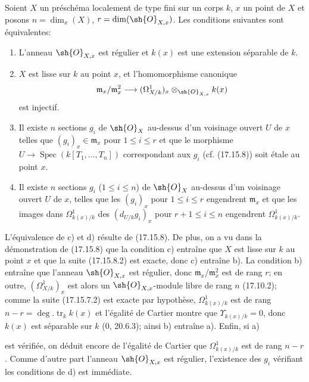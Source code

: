 \begin{corollary}[17.15.9]
\label{IV.17.15.9}
Soient $X$ un préschéma localement de type fini sur un corps $k$, $x$ un point de $X$ et posons $n=\dim_x(X)$, $r=\dim(\sh{O}_{X,x})$. Les conditions suivantes sont équivalentes:
\begin{enumerate}
  \item[a)] L'anneau $\sh{O}_{X,x}$ est régulier et $k(x)$ est une extension séparable de $k$.
  \item[b)] $X$ est lisse sur $k$ au point $x$, et l'homomorphisme canonique
  \[
  \mathfrak m_x/\mathfrak m_x^2\to(\Omega^1_{X/k})_x\otimes_{\sh{O}_{X,x}}k(x)
  \]
  est injectif.
  \item[c)] Il existe $n$ sections $g_i$ de $\sh{O}_X$ au-dessus d'un voisinage ouvert $U$ de $x$ telles que $(g_i)_x\in\mathfrak m_x$ pour $1\leq i\leq r$ et que le morphisme $U\to\operatorname{Spec}(k[T_1,\ldots,T_n])$ correspondant aux $g_i$ (cf. (17.15.8)) soit étale au point $x$.
  \item[d)] Il existe $n$ sections $g_i$ ($1\leq i\leq n$) de $\sh{O}_X$ au-dessus d'un voisinage ouvert $U$ de $x$, telles que les $(g_i)_x$ pour $1\leq i\leq r$ engendrent $\mathfrak m_x$ et que les images dans $\Omega^1_{k(x)/k}$ des $(d_{U/k}g_i)_x$ pour $r+1\leq i\leq n$ engendrent $\Omega^1_{k(x)/k}$.
\end{enumerate}
\end{corollary}

L'équivalence de c) et d) résulte de (17.15.8). De plus, on a vu dans la démonstration de (17.15.8) que la condition c) entraîne que $X$ est lisse sur $k$ au point $x$ et que la suite (17.15.8.2) est exacte, donc c) entraîne b). La condition b) entraîne que l'anneau $\sh{O}_{X,x}$ est régulier, donc $\mathfrak m_x/\mathfrak m_x^2$ est de rang $r$; en outre, $(\Omega^1_{X/k})_x$ est alors un $\sh{O}_{X,x}$-module libre de rang $n$ (17.10.2); comme la suite (17.15.7.2) est exacte par hypothèse, $\Omega^1_{k(x)/k}$ est de rang $n-r=\deg.\operatorname{tr}_k k(x)$ et l'égalité de Cartier montre que $\Upsilon_{k(x)/k}=0$, donc $k(x)$ est séparable sur $k$ (0, 20.6.3); ainsi b) entraîne a). Enfin, si a)


est vérifiée, on déduit encore de l'égalité de Cartier que $\Omega^1_{k(x)/k}$ est de rang $n-r$. Comme d'autre part l'anneau $\sh{O}_{X,x}$ est régulier, l'existence des $g_i$ vérifiant les conditions de d) est immédiate.


